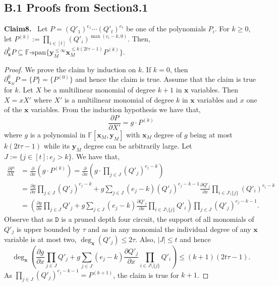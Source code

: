 \documentclass[10pt,a4paper]{article}
\newenvironment{authorclaim}[1]{\par\medskip\noindent\textbf{#1.}\ \ignorespaces}{\par\medskip}
\begin{document}
\subsection*{B.1 Proofs from Section3.1}
\begin{authorclaim}{Claim8}
Let $P=(Q'_1)^{e_1}\cdots(Q'_t)^{e_t}$ be one of the polynomials $P_i$. For $k\ge0$, let $P^{(k)}:=\prod_{i\in[t]}(Q'_i)^{\max(e_i-k,0)}$. Then, $\partial_{\mathbf x}^kP\subseteq\mathbb F\text{-span}\{\mathbf y_M^{\le\infty}\mathbf x_M^{\le k(2t\tau-1)}P^{(k)}\}$.
\end{authorclaim}
\begin{proof}
We prove the claim by induction on $k$. If $k=0$, then $\partial_{\mathbf x_M}^0P=\{P\}=\{P^{(0)}\}$ and hence the claim is true. Assume that the claim is true for $k$. Let $X$ be a multilinear monomial of degree $k+1$ in $\mathbf x$ variables. Then $X=xX'$ where $X'$ is a multilinear monomial of degree $k$ in $\mathbf x$ variables and $x$ one of the $\mathbf x$ variables. From the induction hypothesis we have that,
\[
\frac{\partial P}{\partial X'}=g\cdot P^{(k)}
\]
where $g$ is a polynomial in $\mathbb F[\mathbf x_M,\mathbf y_M]$ with $\mathbf x_M$ degree of $g$ being at most $k(2t\tau-1)$ while its $\mathbf y_M$ degree can be arbitrarily large.
Let $J:=\{j\in[t]:e_j>k\}$. We have that,
\begin{align*}
\frac{\partial P}{\partial X}
&=\frac{\partial}{\partial x}(g\cdot P^{(k)})
=\frac{\partial}{\partial x}\left(g\cdot\prod_{j\in J}(Q'_j)^{e_j-k}\right)\\
&=\frac{\partial g}{\partial x}\prod_{j\in J}(Q'_j)^{e_j-k}
+g\sum_{j\in J}(e_j-k)(Q'_j)^{e_j-k-1}\frac{\partial Q'_j}{\partial x}
\prod_{i\in J\setminus\{j\}}(Q'_i)^{e_i-k}\\
&=\left(\frac{\partial g}{\partial x}\prod_{j\in J}Q'_j
+g\sum_{j\in J}(e_j-k)\frac{\partial Q'_j}{\partial x}
\prod_{i\in J\setminus\{j\}}Q'_i\right)
\prod_{j\in J}(Q'_j)^{e_j-k-1}.
\end{align*}
Observe that as $\mathtt D$ is a pruned depth four circuit, the support of all monomials of $Q'_j$ is upper bounded by $\tau$ and as in any monomial the individual degree of any $\mathbf x$ variable is at most two, $\deg_{\mathbf x}(Q'_j)\le2\tau$. Also, $|J|\le t$ and hence
\[
\deg_{\mathbf x}\left(\frac{\partial g}{\partial x}\prod_{j\in J}Q'_j
+g\sum_{j\in J}(e_j-k)\frac{\partial Q'_j}{\partial x}
\prod_{i\in J\setminus\{j\}}Q'_i\right)\le(k+1)(2t\tau-1).
\]
As $\prod_{j\in J}(Q'_j)^{e_j-k-1}=P^{(k+1)}$, the claim is true for $k+1$.
\end{proof}
\end{document}
